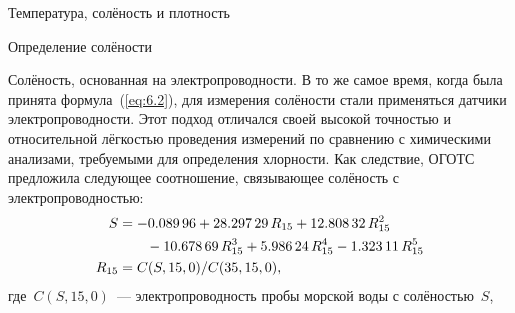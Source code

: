 \begin{chapter}{Температура, солёность и плотность}
\begin{section}{Определение солёности}
\begin{paragraph}{Солёность, основанная на электропроводности.}
В то же самое время, когда была принята формула~(\ref{eq:6.2}), для измерения
солёности стали применяться датчики электропроводности. Этот подход отличался
своей высокой точностью и относительной лёгкостью проведения измерений 
по сравнению с химическими анализами, требуемыми для определения хлорности.
Как следствие, ОГОТС предложила следующее соотношение, 
связывающее солёность с электропроводностью:
\begin{subequations}\label{eq:6.3}
\begin{align}
 S  & = -0.089\,96 + 28.297\,29\,R_{15} + 12.808\,32\,R_{15}^2 \notag \\
    &\qquad -10.678\,69\,R_{15}^3 + 5.986\,24\,R_{15}^4 - 1.323\,11\,R_{15}^5 \\
 R_{15} &= C(S,15,0)/C(35,15,0),
\end{align}
\end{subequations}
где~$C(S,15,0)$~--- электропроводность пробы морской воды с солёностью~$S$,

\end{paragraph}
\end{section}
\end{chapter}
